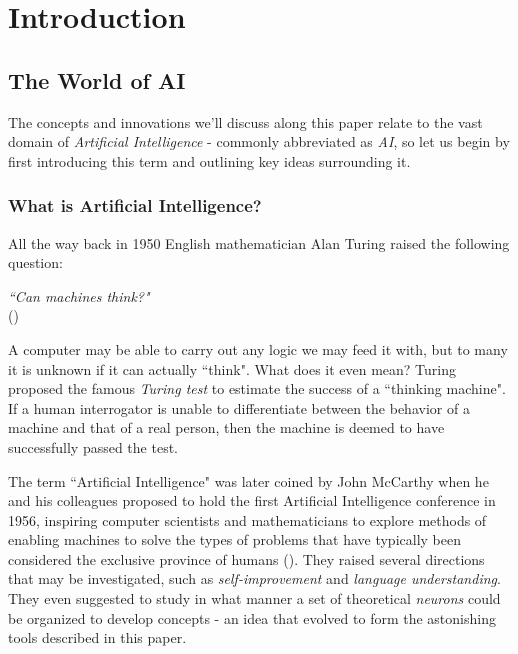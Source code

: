 \documentclass{article}
\begin{document}

\newpage
\section{Introduction}
\label{chap:intro}



\subsection{The World of AI}
\label{sec:ai}

The concepts and innovations we'll discuss along this paper relate to the vast domain of \emph{Artificial Intelligence} - commonly abbreviated as \emph{AI}, so let us begin by first introducing this term and outlining key ideas surrounding it.

\subsubsection{What is Artificial Intelligence?}
\label{subsec:ai}

All the way back in 1950 English mathematician Alan Turing raised the following question:
\begin{center}
    \emph{``Can machines think?"}\\
    (\citet{turing1950computing})
\end{center}
A computer may be able to carry out any logic we may feed it with, but to many it is unknown if it can actually ``think". What does it even mean? Turing proposed the famous \emph{Turing test} to estimate the success of a ``thinking machine". If a human interrogator is unable to differentiate between the behavior of a machine and that of a real person, then the machine is deemed to have successfully passed the test.

\medskip
\noindent
The term ``Artificial Intelligence" was later coined by John McCarthy when he and his colleagues proposed to hold the first Artificial Intelligence conference in 1956, inspiring computer scientists and mathematicians to explore methods of enabling machines to solve the types of problems that have typically been considered the exclusive province of humans (\citet{mccarthy1955proposal}). They raised several directions that may be investigated, such as \emph{self-improvement} and \emph{language understanding}. They even suggested to study in what manner a set of theoretical \emph{neurons} could be organized to develop concepts - an idea that evolved to form the astonishing tools described in this paper.
\end{document}
